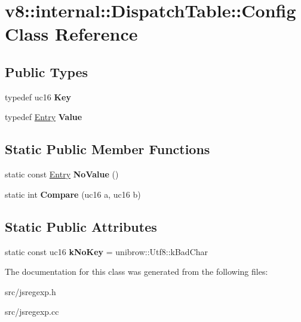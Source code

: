 \hypertarget{classv8_1_1internal_1_1_dispatch_table_1_1_config}{}\section{v8\+:\+:internal\+:\+:Dispatch\+Table\+:\+:Config Class Reference}
\label{classv8_1_1internal_1_1_dispatch_table_1_1_config}
\subsection*{Public Types}
\begin{DoxyCompactItemize}
\item 
\hypertarget{classv8_1_1internal_1_1_dispatch_table_1_1_config_a576c1143313a99d9103de05263aa22e5}{}typedef uc16 {\bfseries Key}\label{classv8_1_1internal_1_1_dispatch_table_1_1_config_a576c1143313a99d9103de05263aa22e5}

\item 
\hypertarget{classv8_1_1internal_1_1_dispatch_table_1_1_config_ac29a7427f5a168fed9eda9780321c7d6}{}typedef \hyperlink{classv8_1_1internal_1_1_dispatch_table_1_1_entry}{Entry} {\bfseries Value}\label{classv8_1_1internal_1_1_dispatch_table_1_1_config_ac29a7427f5a168fed9eda9780321c7d6}

\end{DoxyCompactItemize}
\subsection*{Static Public Member Functions}
\begin{DoxyCompactItemize}
\item 
\hypertarget{classv8_1_1internal_1_1_dispatch_table_1_1_config_a1ce800a2b555281b74ad8d63416358aa}{}static const \hyperlink{classv8_1_1internal_1_1_dispatch_table_1_1_entry}{Entry} {\bfseries No\+Value} ()\label{classv8_1_1internal_1_1_dispatch_table_1_1_config_a1ce800a2b555281b74ad8d63416358aa}

\item 
\hypertarget{classv8_1_1internal_1_1_dispatch_table_1_1_config_a7519ef9b34aa8c447a5102f3ac934e75}{}static int {\bfseries Compare} (uc16 a, uc16 b)\label{classv8_1_1internal_1_1_dispatch_table_1_1_config_a7519ef9b34aa8c447a5102f3ac934e75}

\end{DoxyCompactItemize}
\subsection*{Static Public Attributes}
\begin{DoxyCompactItemize}
\item 
\hypertarget{classv8_1_1internal_1_1_dispatch_table_1_1_config_af77505af3e9f7566079aeab32b1bfa87}{}static const uc16 {\bfseries k\+No\+Key} = unibrow\+::\+Utf8\+::k\+Bad\+Char\label{classv8_1_1internal_1_1_dispatch_table_1_1_config_af77505af3e9f7566079aeab32b1bfa87}

\end{DoxyCompactItemize}


The documentation for this class was generated from the following files\+:\begin{DoxyCompactItemize}
\item 
src/jsregexp.\+h\item 
src/jsregexp.\+cc\end{DoxyCompactItemize}
